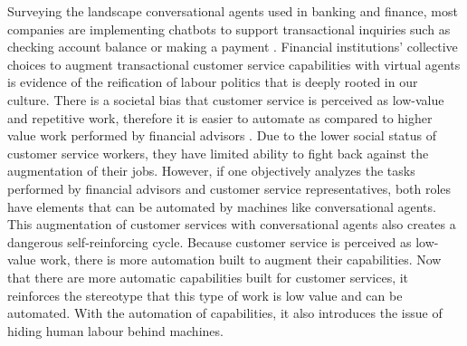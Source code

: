 \documentclass{sigchi-ext}
\begin{document}
Surveying the landscape conversational agents used in banking and finance, most companies are implementing chatbots to support transactional inquiries such as checking account balance or making a payment \cite{chatbotguide}. Financial institutions' collective choices to augment transactional customer service capabilities with virtual agents is evidence of the reification of labour politics that is deeply rooted in our culture. There is a societal bias that customer service is perceived as low-value and repetitive work, therefore it is easier to automate as compared to higher value work performed by financial advisors \cite{dhaliwal2022cyber}. Due to the lower social status of customer service workers, they have limited ability to fight back against the augmentation of their jobs. However, if one objectively analyzes the tasks performed by financial advisors and customer service representatives, both roles have elements that can be automated by machines like conversational agents. This augmentation of customer services with conversational agents also creates a dangerous self-reinforcing cycle. Because customer service is perceived as low-value work, there is more automation built to augment their capabilities. Now that there are more automatic capabilities built for customer services, it reinforces the stereotype that this type of work is low value and can be automated. With the automation of capabilities, it also introduces the issue of hiding human labour behind machines.
\end{document}
